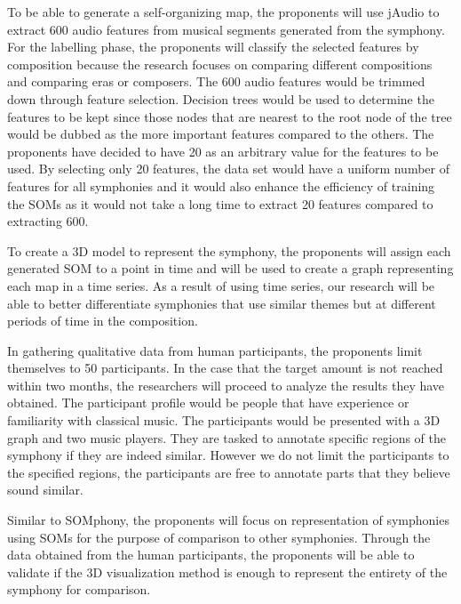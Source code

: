 To be able to generate a self-organizing map, the proponents will use jAudio to extract 600 audio features from musical segments generated from the symphony. For the labelling phase, the proponents will classify the selected features by composition because the research focuses on comparing different compositions and comparing eras or composers. The 600 audio features would be trimmed down through feature selection. Decision trees would be used to determine the features to be kept since those nodes that are nearest to the root node of the tree would be dubbed as the more important features compared to the others. The proponents have decided to have 20 as an arbitrary value for the features to be used. By selecting only 20 features, the data set would have a uniform number of features for all symphonies and it would also enhance the efficiency of training the SOMs as it would not take a long time to extract 20 features compared to extracting 600. 

To create a 3D model to represent the symphony, the proponents will assign each generated SOM to a point in time and will be used to create a graph representing each map in a time series. As a result of using time series, our research will be able to better differentiate symphonies that use similar themes but at different periods of time in the composition.

In gathering qualitative data from human participants, the proponents limit themselves to 50 participants. In the case that the target amount is not reached within two months, the researchers will proceed to analyze the results they have obtained. The participant profile would be people that have experience or familiarity with classical music. The participants would be presented with a 3D graph and two music players. They are tasked to annotate specific regions of the symphony if they are indeed similar. However we do not limit the participants to the specified regions, the participants are free to annotate parts that they believe sound similar. 

Similar to SOMphony, the proponents will  focus on representation of symphonies using SOMs for the purpose of comparison to other symphonies. Through the data obtained from the human participants, the proponents will be able to validate if the 3D visualization method is enough to represent the entirety of the symphony for comparison.


